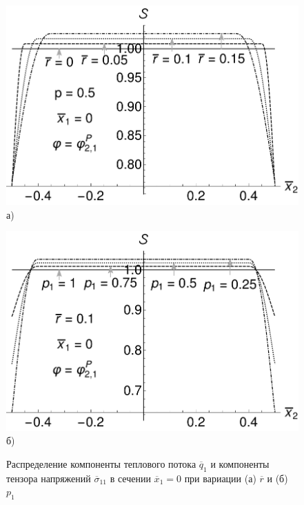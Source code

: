 \begin{figure}[ht]
    \begin{minipage}[b][][b]{0.49\linewidth}\centering
        \includegraphics[width=\linewidth]{pics/HeatFluxStabilityVariationR.pdf} \\ а)
    \end{minipage}
    \hfill
    \begin{minipage}[b][][b]{0.49\linewidth}\centering
        \includegraphics[width=\linewidth]{pics/HeatFluxStabilityVariationP1.pdf} \\ б)
    \end{minipage}
    \caption{Распределение компоненты теплового потока $\overline{q}_1$ и компоненты тензора напряжений $\overline{\sigma}_{11}$ в сечении $\overline{x}_1 = 0$ при вариации (а) $\overline{r}$ и (б) $p_1$}
    \label{fig:SaintVenantVariation}
\end{figure}

